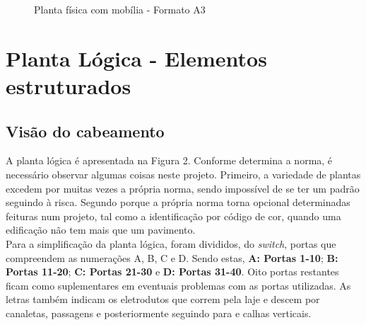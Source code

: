 \documentclass[	DIV=calc,%
							paper=a4,%
							fontsize=12pt,%
							onecolumn]{scrartcl}	 					%
\begin{document}
\clearpage 
{}
\recalctypearea



\begin{figure}
	\noindent{}
	\caption{Planta física com mobília - Formato A3}
	\label{fig1}
\end{figure}

\clearpage
{}
\recalctypearea


\section{Planta Lógica - Elementos estruturados}

\subsection{Visão do cabeamento}
A planta lógica é apresentada na Figura 2. Conforme determina a norma, é necessário observar algumas coisas neste projeto. Primeiro, a variedade de plantas excedem por muitas vezes a própria norma, sendo impossível de se ter um padrão seguindo à risca. Segundo porque a própria norma torna opcional determinadas feituras num projeto, tal como a identificação por código de cor, quando uma edificação não tem mais que um pavimento.
\\

Para a simplificação da planta lógica, foram divididos, do \textit{switch}, portas que compreendem as numerações A, B, C e D. Sendo estas, \textbf{A: Portas 1-10}; \textbf{B: Portas 11-20}; \textbf{C: Portas 21-30} e \textbf{D: Portas 31-40}. Oito portas restantes ficam como suplementares em eventuais problemas com as portas utilizadas. As letras também indicam os eletrodutos que correm pela laje e descem por canaletas, passagens e posteriormente seguindo para e calhas verticais. 
\\
\end{document}
